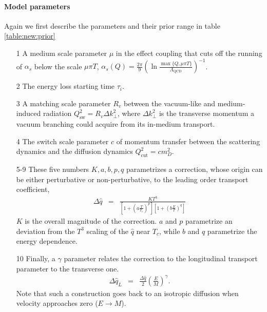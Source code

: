 \paragraph{Model parameters}
Again we first describe the parameters and their prior range in table \ref{table:new:prior}
\begin{itemize}
\item[1] A medium scale parameter $\mu$ in the effect coupling that cuts off the running of $\alpha_s$ below the scale $\mu\pi T$, $\alpha_s(Q) = \frac{2\pi}{9}\left(\ln\frac{\max\{Q, \mu\pi T\}}{\Lambda_{\textrm{QCD}}}\right)^{-1}$.
\item[2] The energy loss starting time $\tau_i$.
\item[3] A matching scale parameter $R_v$ between the vacuum-like and medium-induced radiation $Q_{\textrm{sw}}^2 = R_v\Delta k_\perp^2$, where $\Delta k_\perp^2$ is the transverse momentum a vacuum branching could acquire from its in-medium transport.
\item[4] The switch scale parameter $c$ of momentum transfer between the scattering dynamics and the diffusion dynamics $Q_{\textrm{cut}}^2 = c m_D^2$.
\item[5-9] These five numbers $K,a,b,p,q$ parametrizes a correction, whose origin can be either perturbative or non-perturbative, to the leading order transport coefficient,
\begin{eqnarray}
\Delta\hat{q} &=& \frac{K T^3}{\left[1+\left(a\frac{T}{T_c}\right)^p\right]\left[1+\left(b\frac{E}{T}\right)^q\right]}
\end{eqnarray}
$K$ is the overall magnitude of the correction. $a$ and $p$ parametrize an deviation from the $T^3$ scaling of the $\hat{q}$ near $T_c$, while $b$ and $q$ parametrize the energy dependence.
\item[10] Finally, a $\gamma$ parameter relates the correction to the longitudinal transport parameter to the transverse one.
\begin{eqnarray}
\Delta\hat{q}_L &=& \frac{\Delta\hat{q}}{2} \left(\frac{E}{M}\right)^{\gamma}.
\end{eqnarray}
Note that such a construction goes back to an isotropic diffusion when velocity approaches zero ($E\rightarrow M$).
\end{itemize}

